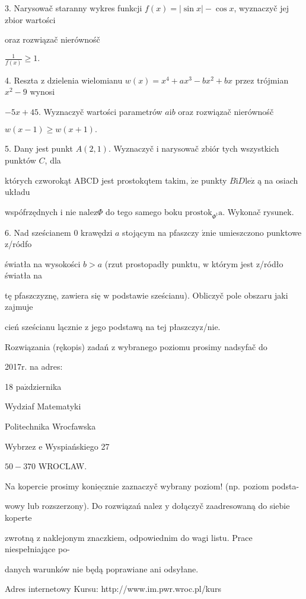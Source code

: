 \documentclass[a4paper,12pt]{article}
\begin{document}
3. Narysowač staranny wykres funkcji $f(x)=|\sin x|-\cos x$, wyznaczyč jej zbior wartości

oraz rozwiązač nierównośč

$\displaystyle \frac{1}{f(x)}\geq 1.$

4. Reszta $\mathrm{z}$ dzielenia wielomianu $w(x)=x^{4}+ax^{3}-bx^{2}+bx$ przez trójmian $x^{2}-9$ wynosi

$-5x+45$. Wyznaczyč wartości parametrów $a\mathrm{i}b$ oraz rozwiązač nierównośč

$w(x-1)\geq w(x+1).$

5. Dany jest punkt $A(2,1)$. Wyznaczyč $\mathrm{i}$ narysowač zbiór tych wszystkich punktów $C$, dla

których czworokąt ABCD jest prostokqtem takim, $\dot{\mathrm{z}}\mathrm{e}$ punkty $B\mathrm{i}D\mathrm{l}\mathrm{e}\dot{\mathrm{z}}$ ą na osiach układu

wspófrzędnych $\mathrm{i}$ nie $\mathrm{n}\mathrm{a}\mathrm{l}\mathrm{e}\mathrm{z}\Phi$ do tego samego boku $\mathrm{p}\mathrm{r}\mathrm{o}\mathrm{s}\mathrm{t}\mathrm{o}\mathrm{k}_{\Phi^{\mathrm{t}}}\mathrm{a}$. Wykonač rysunek.

6. Nad sześcianem $0$ krawędzi $a$ stojącym na pfaszczy $\acute{\mathrm{z}}\mathrm{n}\mathrm{i}\mathrm{e}$ umieszczono punktowe z/ródfo

światła na wysokości $b>a$ (rzut prostopadły punktu, $\mathrm{w}$ którym jest z/ródło światła na

tę pfaszczyznę, zawiera się $\mathrm{w}$ podstawie sześcianu). Obliczyč pole obszaru jaki zajmuje

cień sześcianu lącznie $\mathrm{z}$ jego podstawą na tej płaszczyz/nie.

Rozwiązania (rękopis) zadań z wybranego poziomu prosimy nadsyfač do

2017r. na adres:

18 $\mathrm{p}\mathrm{a}\acute{\mathrm{z}}$dziernika

Wydziaf Matematyki

Politechnika Wrocfawska

Wybrzez $\mathrm{e}$ Wyspiańskiego 27

$50-370$ WROCLAW.

Na kopercie prosimy $\underline{\mathrm{k}\mathrm{o}\mathrm{n}\mathrm{i}\mathrm{e}\mathrm{c}\mathrm{z}\mathrm{n}\mathrm{i}\mathrm{e}}$ zaznaczyč wybrany poziom! (np. poziom podsta-

wowy lub rozszerzony). Do rozwiązań nalez $\mathrm{y}$ dołączyč zaadresowaną do siebie koperte

zwrotną $\mathrm{z}$ naklejonym znaczkiem, odpowiednim do wagi listu. Prace niespełniające po-

danych warunków nie będą poprawiane ani odsyłane.

Adres internetowy Kursu: http://www.im.pwr.wroc.pl/kurs
\end{document}
